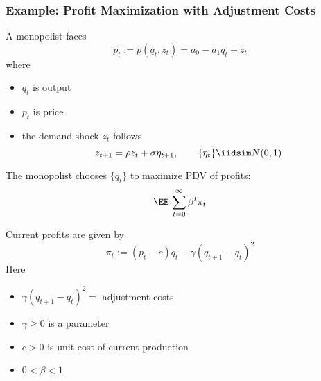 \begin{frame}
    \frametitle{Example: Profit Maximization  with Adjustment Costs}
    
    A monopolist faces 
    \begin{equation*}
        p_t := p(q_t, z_t) = a_0 - a_1 q_t + z_t
    \end{equation*}
    where
    
    \begin{itemize}
        \item $q_t$ is output
        \item $p_t$ is price 
        \item the demand shock $z_t$ follows
            \begin{equation*}
                z_{t+1} = \rho z_t + \sigma \eta_{t+1},
                 \qquad   \{\eta_t \} \iidsim N(0, 1)
            \end{equation*}
    \end{itemize}
    

\end{frame}


\begin{frame}
    
    The monopolist chooses $\{q_t\}$ to maximize PDV of profits:
    \begin{equation*}
        \EE \,
            \sum_{t=0}^{\infty} \beta^t
            \pi_t
    \end{equation*}

    Current profits are given by
    \begin{equation*}
        \pi_t := (p_t  - c) q_t - \gamma (q_{t+1} - q_t)^2
    \end{equation*}
    Here 
    
    \begin{itemize}
        \item $\gamma (q_{t+1} - q_t)^2 =$ adjustment costs 
        \item $\gamma \geq 0$ is a parameter
        \item $c > 0$ is unit cost of current production
        \item $0 < \beta < 1$ 
    \end{itemize}

\end{frame}


